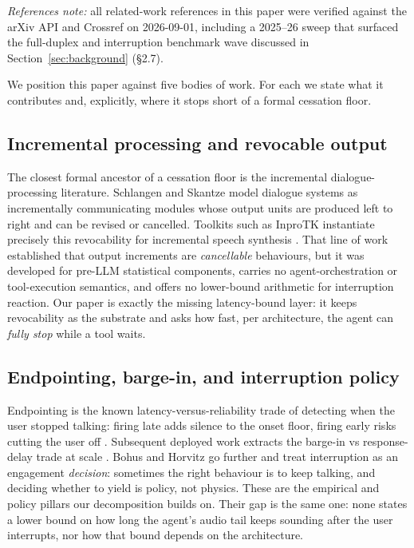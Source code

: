 \emph{References note:} all related-work references in this paper were verified against the
arXiv API and Crossref on 2026-09-01, including a 2025--26 sweep that surfaced the
full-duplex and interruption benchmark wave discussed in Section~\ref{sec:background} (\S2.7).

We position this paper against five bodies of work.
For each we state what it contributes and, explicitly, where it stops short of a formal
cessation floor.

\subsection{Incremental processing and revocable output}
The closest formal ancestor of a cessation floor is the incremental dialogue-processing
literature.
Schlangen and Skantze \citep{schlangen2011general} model dialogue systems as incrementally
communicating modules whose output units are produced left to right and can be revised or
cancelled.
Toolkits such as InproTK instantiate precisely this revocability for incremental speech
synthesis \citep{baumann2012prosodic}.
That line of work established that output increments are \emph{cancellable} behaviours, but it
was developed for pre-LLM statistical components, carries no agent-orchestration or
tool-execution semantics, and offers no lower-bound arithmetic for interruption reaction.
Our paper is exactly the missing latency-bound layer: it keeps revocability as the substrate
and asks how fast, per architecture, the agent can \emph{fully stop} while a tool waits.

\subsection{Endpointing, barge-in, and interruption policy}
Endpointing is the known latency-versus-reliability trade of detecting when the user stopped
talking: firing late adds silence to the onset floor, firing early risks cutting the user off
\citep{raux2008optimizing}.
Subsequent deployed work extracts the barge-in vs response-delay trade at scale
\citep{raux2012optimizing}.
Bohus and Horvitz \citep{bohus2011interruptions} go further and treat interruption as an
engagement \emph{decision}: sometimes the right behaviour is to keep talking, and deciding
whether to yield is policy, not physics.
These are the empirical and policy pillars our decomposition builds on.
Their gap is the same one: none states a lower bound on how long the agent's audio tail keeps
sounding after the user interrupts, nor how that bound depends on the architecture.


